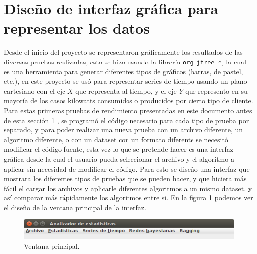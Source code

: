 \section{Diseño de interfaz gráfica para representar los datos} \label{sec:disInterfaz}
Desde el inicio del proyecto se representaron gráficamente los resultados de las diversas pruebas realizadas, esto se hizo usando la librería \texttt{org.jfree.*}, la cual es una herramienta para generar diferentes tipos de gráficos (barras, de pastel, etc.), en este proyecto se usó para representar series de tiempo usando un plano cartesiano con el eje $X$ que representa al tiempo, y el eje $Y$ que represento en su mayoría de los casos kilowatts consumidos o producidos por cierto tipo de cliente. 
Para estas primeras pruebas de rendimiento presentadas en este documento antes de esta sección \ref{sec:disInterfaz}
, se programó el código necesario para cada tipo de prueba por separado, y para poder realizar una nueva prueba con un archivo diferente, un algoritmo diferente, o con un dataset con un formato diferente se necesitó modificar el código fuente, esta vez lo que se pretende hacer es una interfaz gráfica desde la cual el usuario pueda seleccionar el archivo y el algoritmo a aplicar sin necesidad de modificar el código.
Para esto se diseño una interfaz que mostrara los diferentes tipos de pruebas que se pueden hacer, y que hiciera más fácil el cargar los archivos y aplicarle diferentes algoritmos a un mismo dataset, y así comparar más rápidamente los algoritmos entre si.
En la figura \ref{fig:ventanaPrincipal} podemos ver el diseño de la ventana principal de la interfaz. 
\begin{figure}[h]
	\centering
	\includegraphics[width=12cm]{img/ventanaPrincipal.png}
	\caption{Ventana principal.}
	\label{fig:ventanaPrincipal}
\end{figure}

